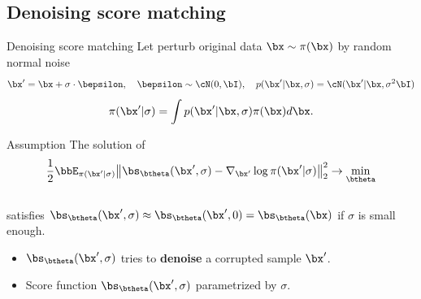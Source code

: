 \subsection{Denoising score matching}
\begin{frame}{Denoising score matching}
	Let perturb original data $\bx \sim \pi(\bx)$ by random normal noise 
	\[
		\bx' = \bx + \sigma \cdot \bepsilon, \quad \bepsilon \sim \cN(0, \bI), \quad p(\bx' | \bx, \sigma) = \cN(\bx' | \bx, \sigma^2 \bI)
	\]
	\vspace{-0.4cm}
	\[
		\pi(\bx' | \sigma) = \int p(\bx' | \bx, \sigma) \pi(\bx) d\bx.
	\]
	\vspace{-0.4cm} 
	\begin{block}{Assumption}
		The solution of 
		\[
			\frac{1}{2} \bbE_{\pi(\bx' | \sigma)}\bigl\| \bs_{\btheta}(\bx', \sigma) - \nabla_{\bx'} \log \pi(\bx' | \sigma) \bigr\|^2_2 \rightarrow \min_{\btheta}
		\]
		\vspace{-0.3cm} \\
		satisfies $\bs_{\btheta}(\bx', \sigma) \approx \bs_{\btheta}(\bx', 0) = \bs_{\btheta}(\bx)$ if $\sigma$ is small enough.
	\end{block}
	\begin{itemize}
		\item $\bs_{\btheta}(\bx', \sigma)$ tries to \textbf{denoise} a corrupted sample $\bx'$.
		\item Score function $\bs_{\btheta}(\bx', \sigma)$ parametrized by $\sigma$. 
	\end{itemize}
\end{frame}
